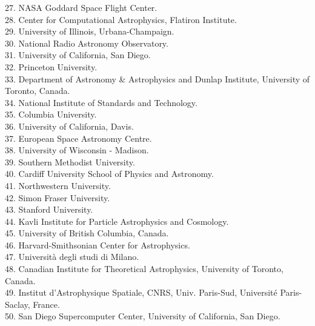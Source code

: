 \documentclass[PICOAPC.tex]{subfiles}
\begin{document}
\begin{multicols}{2}
{27. NASA Goddard Space Flight Center.  \\
28. Center for Computational Astrophysics, Flatiron Institute.  \\
29. University of Illinois, Urbana-Champaign.  \\
30. National Radio Astronomy Observatory.  \\
31. University of California, San Diego.  \\
32. Princeton University.  \\
33. Department of Astronomy \& Astrophysics and Dunlap Institute, University of Toronto, Canada.  \\
34. National Institute of Standards and Technology.  \\
35. Columbia University.  \\
36. University of California, Davis.  \\
37. European Space Astronomy Centre.  \\
38. University of Wisconsin - Madison.  \\
39. Southern Methodist University.  \\
40. Cardiff University School of Physics and Astronomy.  \\
41. Northwestern University.  \\
42. Simon Fraser University.  \\
43. Stanford University.  \\
44. Kavli Institute for Particle Astrophysics and Cosmology.  \\
45. University of British Columbia, Canada.  \\
46. Harvard-Smithsonian Center for Astrophysics.  \\
47. Universit\`a degli studi di Milano.  \\
48. Canadian Institute for Theoretical Astrophysics, University of Toronto, Canada.  \\
49. Institut d'Astrophysique Spatiale, CNRS, Univ. Paris-Sud, Universit\'e Paris-Saclay, France.  \\
50. San Diego Supercomputer Center, University of California, San Diego.


}
\end{multicols}

\vskip -7pt
\end{document}
